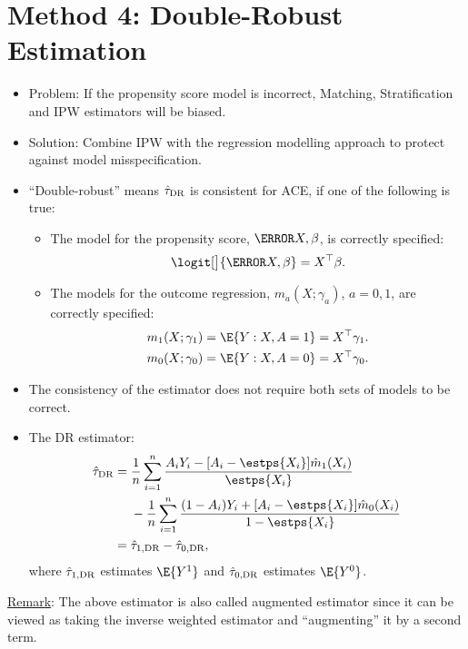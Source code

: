 \section{Method 4: Double-Robust Estimation}
\begin{itemize}
      \item Problem: If the propensity score model is incorrect, Matching,
            Stratification and IPW estimators will be biased.
      \item Solution: Combine IPW with the regression modelling
            approach to protect against model misspecification.
\end{itemize}
\begin{Regular}{}
      \begin{itemize}
            \item ``Double-robust'' means $ \hat{\tau}_{\text{DR}} $ is consistent for ACE, if one of the following is true:
                  \begin{itemize}
                        \item The model for the propensity score, $ \ps{X,\beta} $, is correctly specified:
                              \[ \logit[\big]{\ps{X,\beta}}=X^\top \beta. \]
                        \item The models for the outcome regression, $ m_a(X;\gamma_a) $, $ a=0,1 $, are correctly specified:
                              \begin{align*}
                                    m_1(X;\gamma_1) & =\E{Y\given X,A=1}=X^\top \gamma_1. \\
                                    m_0(X;\gamma_0) & =\E{Y\given X,A=0}=X^\top \gamma_0.
                              \end{align*}
                  \end{itemize}
            \item The consistency of the estimator does not require both sets of
                  models to be correct.
            \item The DR estimator:
                  \begin{align*}
                        \hat{\tau}_{\DR}
                         & =\frac{1}{n}\sum_{i=1}^{n}\frac{A_i Y_i-[A_i-\estps{X_i}]\hat{m}_1(X_i)}{\estps{X_i}}                     \\
                         & \phantom{{}={}}-\frac{1}{n}\sum_{i=1}^{n}\frac{(1-A_i)Y_i+[A_i-\estps{X_i}]\hat{m}_0(X_i)}{1-\estps{X_i}} \\
                         & =\hat{\tau}_{1,\DR}-\hat{\tau}_{0,\DR},
                  \end{align*}
                  where $ \hat{\tau}_{1,\text{DR}} $ estimates $ \E{Y^1} $ and $ \hat{\tau}_{0,\text{DR}} $ estimates $ \E{Y^0} $.
      \end{itemize}
      \tcblower{}
      \underline{Remark}: The above estimator is also called augmented estimator
      since it can be viewed as taking the inverse weighted
      estimator and ``augmenting'' it by a second term.
\end{Regular}
